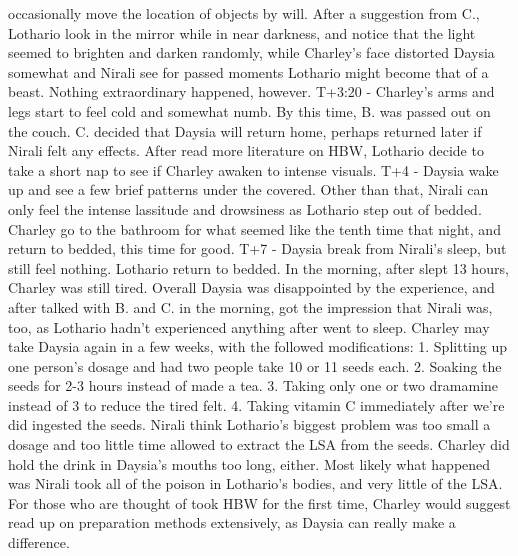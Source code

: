 \documentclass[12pt]{book}
\begin{document}
occasionally move the location of objects by will. After a suggestion from C., Lothario look in the mirror while in near darkness, and notice that the light seemed to brighten and darken randomly, while Charley's face distorted Daysia somewhat and Nirali see for passed moments Lothario might become that of a beast. Nothing extraordinary happened, however. T+3:20 - Charley's arms and legs start to feel cold and somewhat numb. By this time, B. was passed out on the couch. C. decided that Daysia will return home, perhaps returned later if Nirali felt any effects. After read more literature on HBW, Lothario decide to take a short nap to see if Charley awaken to intense visuals. T+4 - Daysia wake up and see a few brief patterns under the covered. Other than that, Nirali can only feel the intense lassitude and drowsiness as Lothario step out of bedded. Charley go to the bathroom for what seemed like the tenth time that night, and return to bedded, this time for good. T+7 - Daysia break from Nirali's sleep, but still feel nothing. Lothario return to bedded. In the morning, after slept 13 hours, Charley was still tired. Overall Daysia was disappointed by the experience, and after talked with B. and C. in the morning, got the impression that Nirali was, too, as Lothario hadn't experienced anything after went to sleep. Charley may take Daysia again in a few weeks, with the followed modifications: 1. Splitting up one person's dosage and had two people take 10 or 11 seeds each. 2. Soaking the seeds for 2-3 hours instead of made a tea. 3. Taking only one or two dramamine instead of 3 to reduce the tired felt. 4. Taking vitamin C immediately after we're did ingested the seeds. Nirali think Lothario's biggest problem was too small a dosage and too little time allowed to extract the LSA from the seeds. Charley did hold the drink in Daysia's mouths too long, either. Most likely what happened was Nirali took all of the poison in Lothario's bodies, and very little of the LSA. For those who are thought of took HBW for the first time, Charley would suggest read up on preparation methods extensively, as Daysia can really make a difference.
\end{document}

